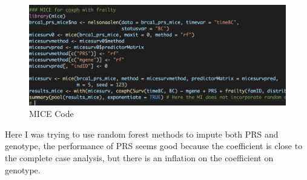 \documentclass[preprint,12pt]{elsarticle}
\begin{document}
\begin{figure}[!htb]
    \centering
    \includegraphics[width=0.5\linewidth]{Figuras/MICE in survival, fail to incorp frailty.png}
    \caption{MICE Code}\label{Fig:MICE no Frailty}
\end{figure}

Here I was trying to use random forest methods to impute both PRS and genotype, the performance of PRS seems good because the coefficient is close to the complete case analysis, but there is an inflation on the coefficient on genotype. 






%
%





\end{document}
